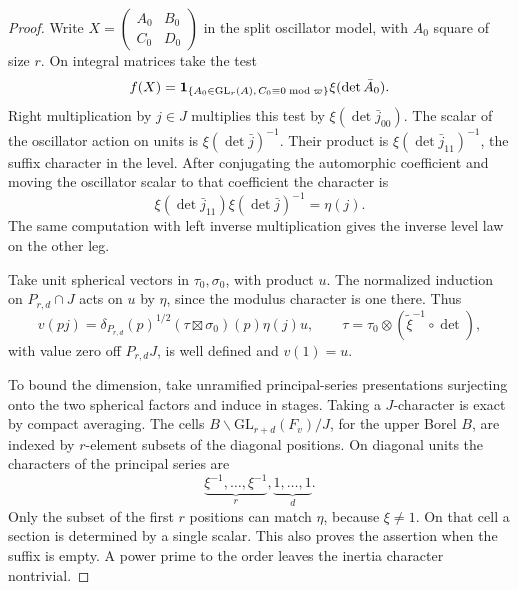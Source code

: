 \begin{proof}
Write \(X=\left(\begin{smallmatrix}A_0&B_0\\C_0&D_0\end{smallmatrix}\right)\)
in the split oscillator model, with \(A_0\) square of size \(r\).
On integral matrices take the test
\[
 f(X)={\bf1}_{\{A_0\in\mathrm{GL}_r(A),\,C_0\equiv0\bmod\varpi\}}
                   \xi(\det\bar A_0).
\]
Right multiplication by \(j\in J\) multiplies this test by
\(\xi(\det\bar j_{00})\). The scalar of the oscillator action on units
is \(\xi(\det\bar j)^{-1}\). Their product is
\(\xi(\det\bar j_{11})^{-1}\), the suffix character in the level.
After conjugating the automorphic coefficient and moving the
oscillator scalar to that coefficient the character is
\[
     \xi(\det\bar j_{11})\xi(\det\bar j)^{-1}=\eta(j).
\]
The same computation with left inverse multiplication gives the
inverse level law on the other leg.

Take unit spherical vectors in \(\tau_0,\sigma_0\), with product \(u\).
The normalized induction on \(P_{r,d}\cap J\) acts on \(u\) by
\(\eta\), since the modulus character is one there. Thus
\[
 v(pj)=\delta_{P_{r,d}}(p)^{1/2}
             (\tau\boxtimes\sigma_0)(p)\eta(j)u,\qquad
 \tau=\tau_0\otimes(\widetilde\xi^{-1}\circ\det),
\]
with value zero off \(P_{r,d}J\), is well defined and \(v(1)=u\).

To bound the dimension, take unramified principal-series
presentations surjecting onto the two spherical factors and induce
in stages. Taking a \(J\)-character is exact by compact averaging.
The cells \(B\backslash \mathrm{GL}_{r+d}(F_v)/J\), for the upper Borel
\(B\), are indexed by \(r\)-element subsets of the diagonal positions.
On diagonal units the characters of the principal series are
\[
        \underbrace{\xi^{-1},\ldots,\xi^{-1}}_{r},
        \underbrace{1,\ldots,1}_{d}.
\]
Only the subset of the first \(r\) positions can match \(\eta\),
because \(\xi\ne1\). On that cell a section is determined by a single
scalar. This also proves the assertion when the suffix is empty.
A power prime to the order leaves the inertia character nontrivial.
\end{proof}

